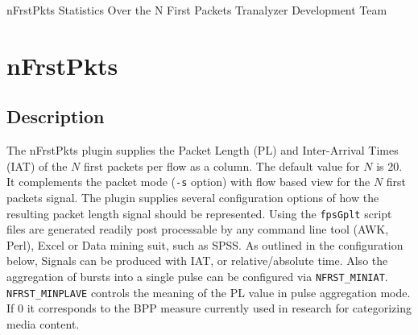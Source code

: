 \documentclass[documentation]{subfiles}
\begin{document}
\trantitle
    {nFrstPkts}
    {Statistics Over the N First Packets}
    {Tranalyzer Development Team} %

\section{nFrstPkts}\label{s:nFrstPkts}

\subsection{Description}
The nFrstPkts plugin supplies the Packet Length (PL) and Inter-Arrival Times (IAT) of the $N$ first packets per flow as a column. The default value for $N$ is 20.
It complements the packet mode ({\tt -s} option) with flow based view for the $N$ first packets signal. The plugin supplies several configuration options of how the
resulting packet length signal should be represented. Using the {\tt fpsGplt} script files are generated readily post processable by any command line tool (AWK, Perl),
Excel or Data mining suit, such as SPSS. As outlined in the configuration below, Signals can be produced with IAT, or relative/absolute time. Also the
aggregation of bursts into a single pulse can be configured via {\tt NFRST\_MINIAT}. {\tt NFRST\_MINPLAVE} controls the meaning of the PL value in pulse aggregation
mode. If 0 it corresponds to the BPP measure currently used in research for categorizing media content.
\end{document}
